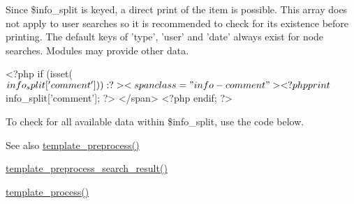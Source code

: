 Since \$info\_\-split is keyed, a direct print of the item is possible. This array does not apply to user searches so it is recommended to check for its existence before printing. The default keys of 'type', 'user' and 'date' always exist for node searches. Modules may provide other data. 
\begin{DoxyCode}
   <?php if (isset($info_split['comment'])): ?>
     <span class="info-comment">
       <?php print $info_split['comment']; ?>
     </span>
   <?php endif; ?>
\end{DoxyCode}


To check for all available data within \$info\_\-split, use the code below. 


\begin{DoxySeeAlso}{See also}
\hyperlink{includes_2theme_8inc_a3eeb7bcdba7ef4859f99586da264d347}{template\_\-preprocess()} 

\hyperlink{search_8pages_8inc_a45d5ee9444aba311056f3949e503b426}{template\_\-preprocess\_\-search\_\-result()} 

\hyperlink{includes_2theme_8inc_a9b4d56c55dab2c59b7af6f71d6b1a940}{template\_\-process()} 
\end{DoxySeeAlso}
